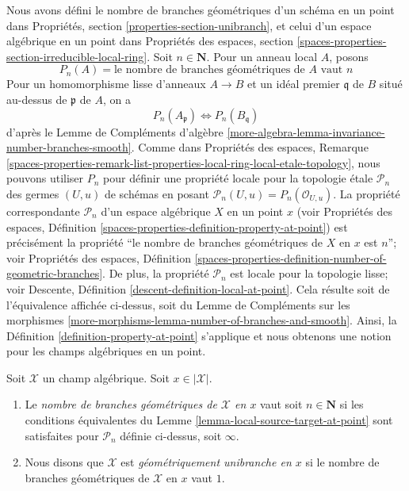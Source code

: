 \noindent
Nous avons défini le nombre de branches géométriques d'un schéma en un point
dans Propriétés, section \ref{properties-section-unibranch},
et celui d'un espace algébrique en un point dans Propriétés des espaces, section
\ref{spaces-properties-section-irreducible-local-ring}.
Soit $n \in \mathbf{N}$. Pour un anneau local $A$, posons
$$
P_n(A) = \text{le nombre de branches géométriques de }A\text{ vaut }n
$$
Pour un homomorphisme lisse d'anneaux $A \to B$ et un idéal premier $\mathfrak q$
de $B$ situé au-dessus de $\mathfrak p$ de $A$, on a
$$
P_n(A_\mathfrak p) \Leftrightarrow P_n(B_\mathfrak q)
$$
d'après le Lemme de Compléments d'algèbre
\ref{more-algebra-lemma-invariance-number-branches-smooth}.
Comme dans Propriétés des espaces, Remarque
\ref{spaces-properties-remark-list-properties-local-ring-local-etale-topology},
nous pouvons utiliser $P_n$ pour définir une propriété locale pour la topologie \'etale $\mathcal{P}_n$
des germes $(U, u)$ de schémas en posant
$\mathcal{P}_n(U, u) = P_n(\mathcal{O}_{U, u})$.
La propriété correspondante $\mathcal{P}_n$
d'un espace algébrique $X$ en un point $x$
(voir Propriétés des espaces, Définition
\ref{spaces-properties-definition-property-at-point})
est précisément la propriété
``le nombre de branches géométriques de $X$ en $x$ est $n$''; voir
Propriétés des espaces, Définition
\ref{spaces-properties-definition-number-of-geometric-branches}.
De plus, la propriété $\mathcal{P}_n$ est locale pour la topologie lisse; voir
Descente, Définition \ref{descent-definition-local-at-point}.
Cela résulte soit de l'équivalence affichée ci-dessus,
soit du Lemme de Compléments sur les morphismes
\ref{more-morphisms-lemma-number-of-branches-and-smooth}.
Ainsi, la Définition \ref{definition-property-at-point}
s'applique et nous obtenons une notion pour les champs algébriques en un point.

\begin{definition}
\label{definition-number-of-geometric-branches}
Soit $\mathcal{X}$ un champ algébrique. Soit $x \in |\mathcal{X}|$.
\begin{enumerate}
\item Le {\it nombre de branches géométriques de $\mathcal{X}$ en $x$}
vaut soit $n \in \mathbf{N}$ si les conditions équivalentes du
Lemme \ref{lemma-local-source-target-at-point} sont satisfaites pour
$\mathcal{P}_n$ définie ci-dessus, soit $\infty$.
\item Nous disons que $\mathcal{X}$ est {\it géométriquement unibranche en $x$}
si le nombre de branches géométriques de $\mathcal{X}$ en $x$ vaut $1$.
\end{enumerate}
\end{definition}






